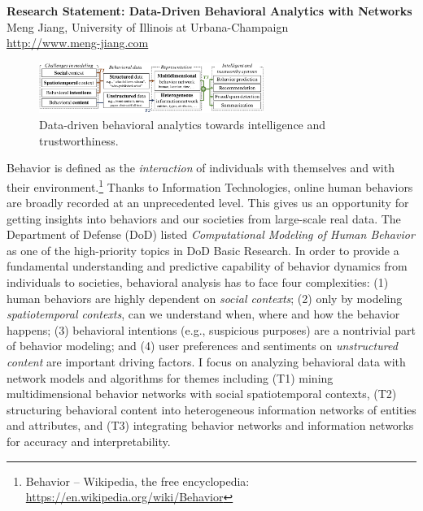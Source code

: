 \documentclass[10.5pt]{article}
\begin{document}


\begin{center}
{\Large \bf Research Statement: Data-Driven Behavioral Analytics with Networks} \\
\vskip 0.05in
{\large Meng Jiang, University of Illinois at Urbana-Champaign} \\
{\url{http://www.meng-jiang.com}}
\vskip -0.20in
\end{center}

\begin{figure}
\vskip -0.18in
\includegraphics[width=0.65\textwidth]{figure/intro.pdf}
\vskip -0.18in
\caption{Data-driven behavioral analytics towards intelligence and trustworthiness.}
\label{fig:intro}
\vskip -0.12in
\end{figure}

Behavior is defined as the \textit{interaction} of individuals with themselves and with their environment.\footnote{Behavior -- Wikipedia, the free encyclopedia: \url{https://en.wikipedia.org/wiki/Behavior}} Thanks to Information Technologies, online human behaviors are broadly recorded at an unprecedented level. This gives us an opportunity for getting insights into behaviors and our societies from large-scale real data.
The Department of Defense (DoD) listed \textit{Computational Modeling of Human Behavior} as one of the high-priority topics in DoD Basic Research.
In order to provide a fundamental understanding and predictive capability of behavior dynamics from individuals to societies, behavioral analysis has to face four complexities: (1) human behaviors are highly dependent on \textit{social contexts}; (2) only by modeling \textit{spatiotemporal contexts}, can we understand when, where and how the behavior happens; (3) behavioral intentions (e.g., suspicious purposes) are a nontrivial part of behavior modeling; and (4) user preferences and sentiments on \textit{unstructured content} are important driving factors.
I focus on analyzing behavioral data with network models and algorithms for themes including (T1) mining multidimensional behavior networks with social spatiotemporal contexts, (T2) structuring behavioral content into heterogeneous information networks of entities and attributes, and (T3) integrating behavior networks and information networks for accuracy and interpretability.
\end{document}
